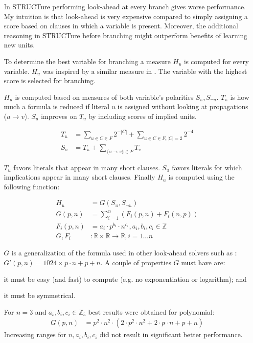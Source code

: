 In STRUCTure performing look-ahead at every branch gives worse
performance. My intuition is that look-ahead is very expensive
compared to simply assigning a score based on clauses in which a
variable is present. Moreover, the additional reasoning in STRUCTure
before branching might outperform benefits of learning new units.

To determine the best variable for branching a measure $H_u$
is computed for every variable.  $H_u$ was inspired by a similar
measure in \cite{mine:oksolver}. The variable with the highest
score is selected for branching.

$H_u$ is computed based on measures of both variable's polarities
$S_u, S_{\neg u}$. $T_u$ is how much a formula is reduced if literal
$u$ is assigned without looking at propagations ($u \rightarrow
v$). $S_u$ improves on $T_u$ by including scores of implied units.

\begin{align}
  T_u &= \sum_{u \in C \in F}{2^{-|C|}} + \sum_{u \in C \in F, |C| = 2}{2^{-4}} \\
  S_u &= T_u + \sum_{\{ u \rightarrow v \} \in F}{T_v}
\end{align}

$T_u$ favors literals that appear in many short clauses.
$S_u$ favors literals for which implications appear in many short clauses.
Finally $H_u$ is computed using the following function:

\begin{align}
  H_u &= G(S_u, S_{\neg u}) \\
  G(p, n) &= \sum_{i=1}^{n}{(F_i(p, n) + F_i(n, p))} \\
  F_i(p, n) &= a_i \cdot p^{b_i} \cdot n^{c_i}, a_i, b_i, c_i \in \mathbb{Z} \\
  G, F_i &: \mathbb{R} \times \mathbb{R} \rightarrow \mathbb{R}, i = 1 \ldots n
\end{align}

$G$ is a generalization of the formula used in other
look-ahead solvers such as \cite{mine:march}: $G'(p, n) =
1024 \times p \cdot n + p + n$. A couple of properties $G$ must have are:
\begin{inparaenum}[a)]
  \item it must be easy (and fast) to compute (e.g. no exponentiation or logarithm); and
  \item it must be symmetrical.
\end{inparaenum}


For $n = 3$ and $a_i, b_i, c_i \in \mathbb{Z}_5$ best results were
obtained for polynomial:
\begin{align}
  G(p, n) &=  p^2 \cdot n^2 \cdot (2 \cdot p^2 \cdot n^2 + 2 \cdot p \cdot n + p + n)
\end{align}
Increasing ranges for $n, a_i, b_i, c_i$ did not result in
significant better performance.


